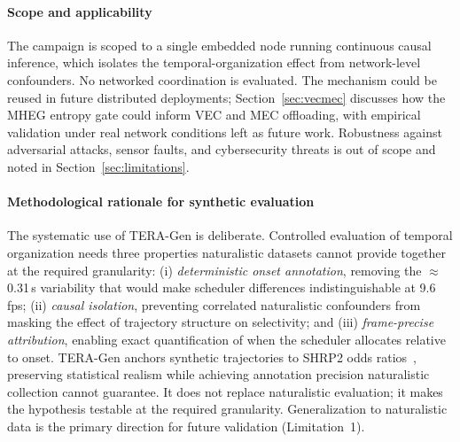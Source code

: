 \documentclass[a4paper,fleqn]{cas-dc}
\newcommand{\TERAGen}{\mbox{TERA-Gen}\xspace}
\newcommand{\MHEG}{\mbox{MHEG}\xspace}
\begin{document}
\paragraph{Scope and applicability}
\label{sec:scope}
The campaign is scoped to a single embedded node running continuous causal
inference, which isolates the temporal-organization effect from network-level
confounders. No networked coordination is evaluated. The mechanism could be
reused in future distributed deployments; Section~\ref{sec:vecmec} discusses how
the \MHEG entropy gate could inform VEC and MEC offloading, with empirical
validation under real network conditions left as future work. Robustness against
adversarial attacks, sensor faults, and cybersecurity threats is out of scope
and noted in Section~\ref{sec:limitations}.
\paragraph{Methodological rationale for synthetic evaluation}
The systematic use of \TERAGen is deliberate. Controlled evaluation of temporal
organization needs three properties naturalistic datasets cannot provide
together at the required granularity: (i) \emph{deterministic onset annotation},
removing the $\approx$0.31\,s variability that would make scheduler differences
indistinguishable at 9.6\,fps; (ii) \emph{causal isolation}, preventing
correlated naturalistic confounders from masking the effect of trajectory
structure on selectivity; and (iii) \emph{frame-precise attribution}, enabling
exact quantification of when the scheduler allocates relative to onset. \TERAGen
anchors synthetic trajectories to SHRP2 odds ratios~\cite{dingus2016shrp2},
preserving statistical realism while achieving annotation precision naturalistic
collection cannot guarantee. It does not replace naturalistic evaluation; it
makes the hypothesis testable at the required granularity. Generalization to
naturalistic data is the primary direction for future validation (Limitation~1).
\end{document}
